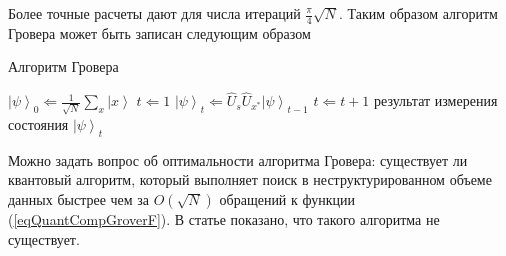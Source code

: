 Более точные расчеты \cite{nielsen2000quantum} дают для числа итераций
$\frac{\pi}{4}\sqrt{N}$. Таким образом алгоритм Гровера может быть
записан следующим образом  
\begin{algorithm}
\caption{Алгоритм Гровера}
\label{algQuantCompGrover}
\begin{algorithmic}
    \STATE $\left|\psi\right>_0 \Leftarrow \frac{1}{\sqrt{N}}\sum_x 
    \left|x\right>$
    \STATE $t \Leftarrow 1$
    \REPEAT
    \STATE $\left|\psi\right>_t \Leftarrow \hat{U}_s\hat{U}_{x^{\ast}}
    \left|\psi\right>_{t-1}$
    \STATE $t \Leftarrow t + 1$
    \RETURN результат измерения состояния $\left|\psi\right>_t$
\end{algorithmic}
\end{algorithm}

Можно задать вопрос об оптимальности алгоритма Гровера: существует ли
квантовый алгоритм, который выполняет поиск в неструктурированном
объеме данных быстрее чем за $O\left(\sqrt{N}\right)$ обращений к
функции (\ref{eqQuantCompGroverF}). В статье
\cite{bBennettGroverOptimal} показано, что такого алгоритма
не существует.
